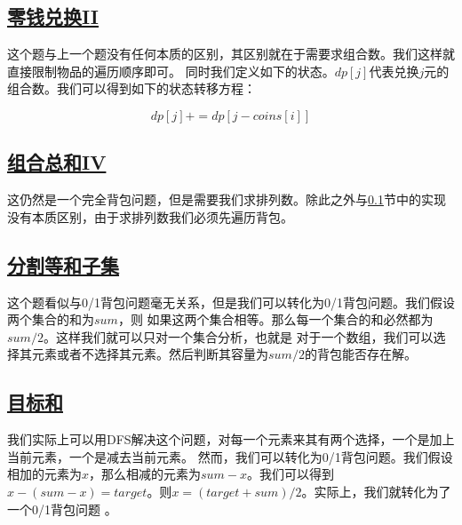 \documentclass[../../main.tex]{subfiles}
\begin{document}


\subsection{\href{https://leetcode-cn.com/problems/coin-change-ii/}{零钱兑换II}}
\label{subsec:coin-change-ii}

这个题与上一个题没有任何本质的区别，其区别就在于需要求组合数。我们这样就直接限制物品的遍历顺序即可。
同时我们定义如下的状态。$dp[j]$代表兑换$j$元的组合数。我们可以得到如下的状态转移方程：

$$
dp[j] += dp[j - coins[i]]
$$



\subsection{\href{https://leetcode-cn.com/problems/combination-sum-iv/}{组合总和IV}}

这仍然是一个完全背包问题，但是需要我们求排列数。除此之外与\ref{subsec:coin-change-ii}节中的实现
没有本质区别，由于求排列数我们必须先遍历背包。



\subsection{\href{https://leetcode.cn/problems/partition-equal-subset-sum/}{分割等和子集}}

这个题看似与0/1背包问题毫无关系，但是我们可以转化为0/1背包问题。我们假设两个集合的和为$sum$，则
如果这两个集合相等。那么每一个集合的和必然都为$sum / 2$。这样我们就可以只对一个集合分析，也就是
对于一个数组，我们可以选择其元素或者不选择其元素。然后判断其容量为$sum / 2$的背包能否存在解。



\subsection{\href{https://leetcode.cn/problems/target-sum/}{目标和}}

我们实际上可以用DFS解决这个问题，对每一个元素来其有两个选择，一个是加上当前元素，一个是减去当前元素。
然而，我们可以转化为0/1背包问题。我们假设相加的元素为$x$，那么相减的元素为$sum - x$。我们可以得到
$x - (sum - x) = target$。则$x = (target + sum) / 2 $。实际上，我们就转化为了一个0/1背包问题
。
\end{document}
